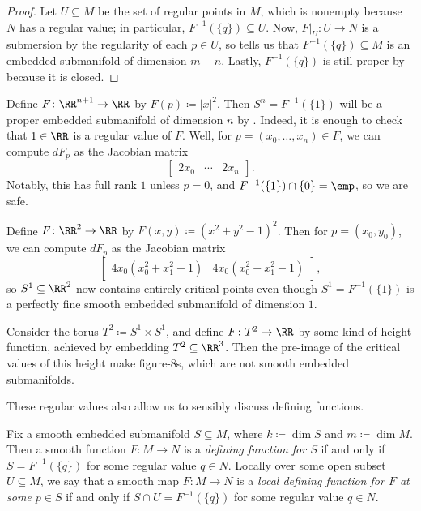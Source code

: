 \documentclass[../notes.tex]{subfiles}
\begin{document}
\begin{proof}
	Let $U\subseteq M$ be the set of regular points in $M$, which is nonempty because $N$ has a regular value; in particular, $F^{-1}(\{q\})\subseteq U$. Now, $F|_U\colon U\to N$ is a submersion by the regularity of each $p\in U$, so  tells us that $F^{-1}(\{q\})\subseteq M$ is an embedded submanifold of dimension $m-n$. Lastly, $F^{-1}(\{q\})$ is still proper by  because it is closed.
\end{proof}
\begin{example} \label{ex:sphere-level-set}
	Define $F\colon\RR^{n+1}\to\RR$ by $F(p)\coloneqq\left|x\right|^2$. Then $S^n=F^{-1}(\{1\})$ will be a proper embedded submanifold of dimension $n$ by . Indeed, it is enough to check that $1\in\RR$ is a regular value of $F$. Well, for $p=(x_0,\ldots,x_n)\in F$, we can compute $dF_p$ as the Jacobian matrix
	\[\begin{bmatrix}
		2x_0 & \cdots & 2x_n
	\end{bmatrix}.\]
	Notably, this has full rank $1$ unless $p=0$, and $F^{-1}(\{1\})\cap\{0\}=\emp$, so we are safe.
\end{example}
\begin{example}
	Define $F\colon\RR^2\to\RR$ by $F(x,y)\coloneqq\left(x^2+y^2-1\right)^2$. Then for $p=(x_0,y_0)$, we can compute $dF_p$ as the Jacobian matrix
	\[\begin{bmatrix}
		4x_0\left(x_0^2+x_1^2-1\right) & 4x_0\left(x_0^2+x_1^2-1\right)
	\end{bmatrix},\]
	so $S^1\subseteq\RR^2$ now contains entirely critical points even though $S^1=F^{-1}(\{1\})$ is a perfectly fine smooth embedded submanifold of dimension $1$.
\end{example}
\begin{example}
	Consider the torus $T^2\coloneqq S^1\times S^1$, and define $F\colon T^2\to\RR$ by some kind of height function, achieved by embedding $T^2\subseteq\RR^3$. Then the pre-image of the critical values of this height make figure-$8$s, which are not smooth embedded submanifolds.
\end{example}
These regular values also allow us to sensibly discuss defining functions.
\begin{definition}
	Fix a smooth embedded submanifold $S\subseteq M$, where $k\coloneqq\dim S$ and $m\coloneqq\dim M$. Then a smooth function $F\colon M\to N$ is a \textit{defining function for $S$} if and only if $S=F^{-1}(\{q\})$ for some regular value $q\in N$. Locally over some open subset $U\subseteq M$, we say that a smooth map $F\colon M\to N$ is a \textit{local defining function for $F$ at some $p\in S$} if and only if $S\cap U=F^{-1}(\{q\})$ for some regular value $q\in N$.
\end{definition}
\end{document}
